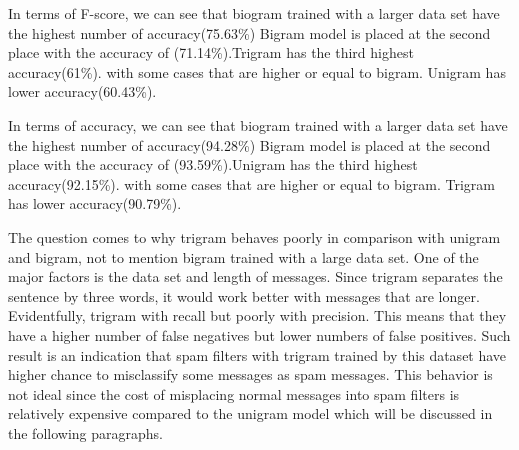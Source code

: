 \documentclass{article}
\begin{document}
In terms of F-score, we can see that biogram trained with a larger data set have the highest number of accuracy(75.63\%) Bigram model is placed at the second place with the accuracy of (71.14\%).Trigram has the third highest accuracy(61\%). with some cases that are higher or equal to bigram. Unigram has lower accuracy(60.43\%).
\newline
\begin{center}
\end{center}


In terms of accuracy, we can see that biogram trained with a larger data set have the highest number of accuracy(94.28\%) Bigram model is placed at the second place with the accuracy of (93.59\%).Unigram has the third highest accuracy(92.15\%). with some cases that are higher or equal to bigram. Trigram has lower accuracy(90.79\%).

The question comes to why trigram behaves poorly in comparison with unigram and bigram, not to mention bigram trained with a large data set. One of the major factors is the data set and length of messages. Since trigram separates the sentence by three words, it would work better with messages that are longer. Evidentfully, trigram with recall but poorly with precision. This means that they have a higher number of false negatives but lower numbers of false positives. Such result is an indication that spam filters with trigram trained by this dataset have higher chance to misclassify some messages as spam messages. This behavior is not ideal since the cost of misplacing normal messages into spam filters is relatively expensive compared to the unigram model which will be discussed in the following paragraphs.
\end{document}

